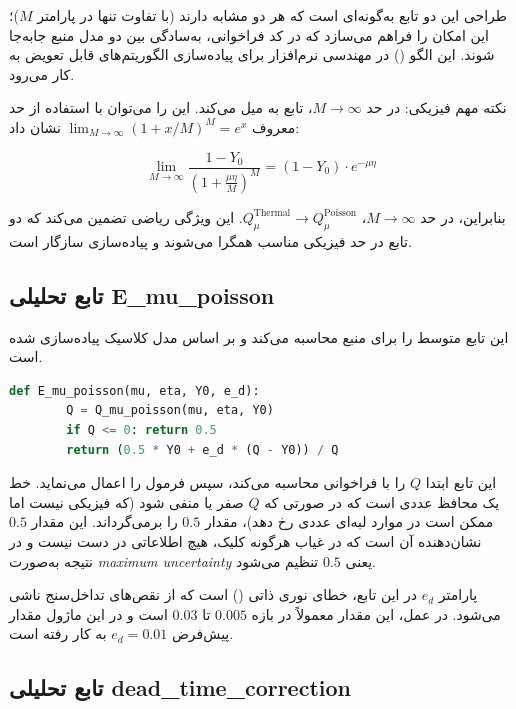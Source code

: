 طراحی این دو تابع به‌گونه‌ای است که هر دو  مشابه دارند (با تفاوت تنها در پارامتر $M$)؛ این امکان را فراهم می‌سازد که در کد فراخوانی، به‌سادگی بین دو مدل منبع جابه‌جا شوند. این الگو () در مهندسی نرم‌افزار برای پیاده‌سازی الگوریتم‌های قابل تعویض به کار می‌رود.

نکته مهم فیزیکی: در حد $M \to \infty$، تابع  به  میل می‌کند. این را می‌توان با استفاده از حد معروف $\lim_{M \to \infty} (1 + x/M)^M = e^x$ نشان داد:

\begin{equation}
	\lim_{M \to \infty} \frac{1 - Y_0}{\left(1 + \frac{\mu \eta}{M}\right)^M} = (1 - Y_0) \cdot e^{-\mu \eta}
\end{equation}

بنابراین، در حد $M \to \infty$، $Q_\mu^{\text{Thermal}} \to Q_\mu^{\text{Poisson}}$. این ویژگی ریاضی تضمین می‌کند که دو تابع در حد فیزیکی مناسب همگرا می‌شوند و پیاده‌سازی سازگار است.

\subsection{تابع تحلیلی E\_mu\_poisson}

این تابع  متوسط را برای منبع  محاسبه می‌کند و بر اساس مدل کلاسیک  پیاده‌سازی شده است.

\begin{LTR}
	\begin{lstlisting}[language=Python]
		def E_mu_poisson(mu, eta, Y0, e_d):
		Q = Q_mu_poisson(mu, eta, Y0)
		if Q <= 0: return 0.5
		return (0.5 * Y0 + e_d * (Q - Y0)) / Q
	\end{lstlisting}
\end{LTR}

این تابع ابتدا  $Q$ را با فراخوانی  محاسبه می‌کند، سپس فرمول  را اعمال می‌نماید. خط  یک محافظ عددی است که در صورتی که $Q$ صفر یا منفی شود (که فیزیکی نیست اما ممکن است در موارد لبه‌ای عددی رخ دهد)، مقدار $0.5$ را برمی‌گرداند. این مقدار $0.5$ نشان‌دهنده آن است که در غیاب هرگونه کلیک، هیچ اطلاعاتی در دست نیست و در نتیجه  به‌صورت \emph{maximum uncertainty} یعنی $0.5$ تنظیم می‌شود.

پارامتر $e_d$ در این تابع، خطای نوری ذاتی () است که از نقص‌های تداخل‌سنج ناشی می‌شود. در عمل، این مقدار معمولاً در بازه $0.005$ تا $0.03$ است و در این ماژول مقدار پیش‌فرض $e_d = 0.01$ به کار رفته است.

\subsection{تابع تحلیلی dead\_time\_correction}

